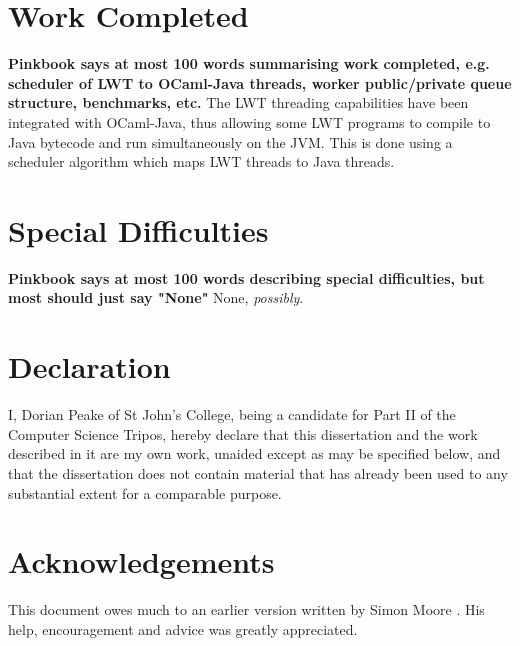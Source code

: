 \documentclass[12pt,twoside,notitlepage]{report}
\begin{document}
\section*{Work Completed}
{\bf Pinkbook says at most 100 words summarising work completed, e.g. scheduler of LWT to OCaml-Java threads, worker public/private queue structure, benchmarks, etc.}
The LWT threading capabilities have been integrated with OCaml-Java, thus allowing some LWT programs to compile to Java bytecode and run simultaneously on the JVM. This is done using a scheduler algorithm which maps LWT threads to Java threads. 

\section*{Special Difficulties}
{\bf Pinkbook says at most 100 words describing special difficulties, but most should just say "None" }
None, {\em possibly}.

\newpage
\section*{Declaration}

I, Dorian Peake of St John's College, being a candidate for Part II of the Computer
Science Tripos, hereby declare
that this dissertation and the work described in it are my own work,
unaided except as may be specified below, and that the dissertation
does not contain material that has already been used to any substantial
extent for a comparable purpose.

\bigskip
{}

\medskip
{}

\cleardoublepage

\tableofcontents

\listoffigures

\newpage
\section*{Acknowledgements}
This document owes much to an earlier version written by Simon Moore
.  His help, encouragement and advice was greatly 
appreciated.


\cleardoublepage        %
\end{document}
